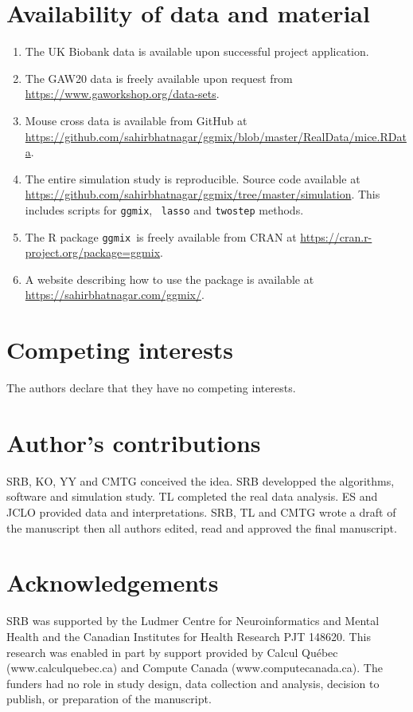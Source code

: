 \documentclass[10pt,letterpaper]{article}
\newcommand{\ggmix}{\texttt{ggmix}}
\begin{document}
\section*{Availability of data and material}
\begin{enumerate}
	\item The UK Biobank data is available upon successful project application.
	\item The GAW20 data is freely available upon request from \url{https://www.gaworkshop.org/data-sets}.
	\item Mouse cross data is available from GitHub at \url{https://github.com/sahirbhatnagar/ggmix/blob/master/RealData/mice.RData}. 
	\item The entire simulation study is reproducible. Source code available at \url{https://github.com/sahirbhatnagar/ggmix/tree/master/simulation}. This includes scripts for \ggmix, ~\texttt{lasso} and \texttt{twostep} methods. 
	\item The R package \ggmix ~is freely available from CRAN at \url{https://cran.r-project.org/package=ggmix}.
	\item A website describing how to use the package is available at \url{https://sahirbhatnagar.com/ggmix/}.
\end{enumerate}

\section*{Competing interests}
The authors declare that they have no competing interests.

\section*{Author's contributions}
SRB, KO, YY and CMTG conceived the idea. SRB developped the algorithms, software and simulation study. TL completed the real data analysis. ES and JCLO provided data and interpretations. SRB, TL and CMTG wrote a draft of the manuscript then all authors edited, read and approved the final manuscript.

\section*{Acknowledgements}
SRB was supported by the Ludmer Centre for Neuroinformatics and Mental Health and the Canadian Institutes for Health Research PJT 148620. This research was enabled in part by support provided by Calcul Québec (www.calculquebec.ca) and Compute Canada (www.computecanada.ca). The funders had no role in study design, data collection and analysis, decision to publish, or preparation of the manuscript.
\end{document}
